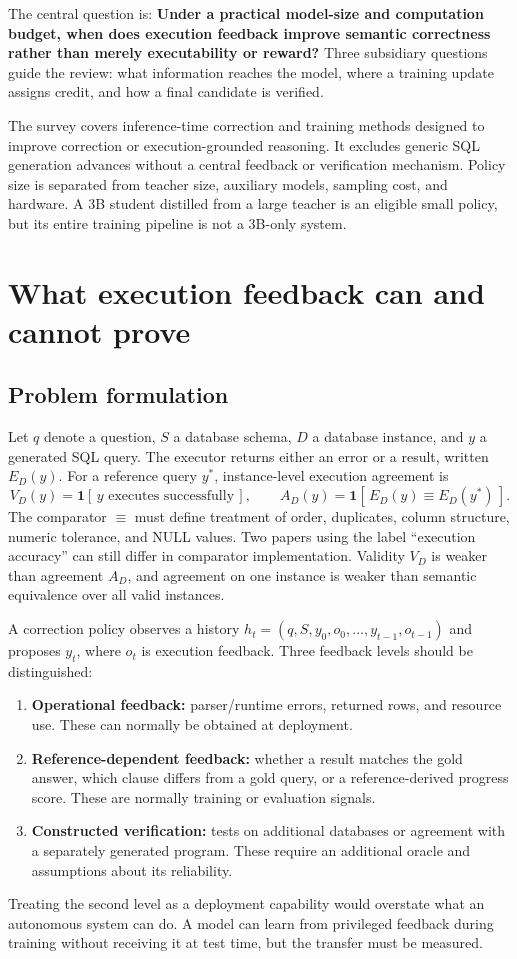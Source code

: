 \documentclass[11pt,a4paper]{article}
\begin{document}
The central question is: \textbf{Under a practical model-size and computation budget, when does execution feedback improve semantic correctness rather than merely executability or reward?} Three subsidiary questions guide the review: what information reaches the model, where a training update assigns credit, and how a final candidate is verified.

The survey covers inference-time correction and training methods designed to improve correction or execution-grounded reasoning. It excludes generic SQL generation advances without a central feedback or verification mechanism. Policy size is separated from teacher size, auxiliary models, sampling cost, and hardware. A 3B student distilled from a large teacher is an eligible small policy, but its entire training pipeline is not a 3B-only system.

\clearpage
\section{What execution feedback can and cannot prove}
\subsection{Problem formulation}
Let $q$ denote a question, $S$ a database schema, $D$ a database instance, and $y$ a generated SQL query. The executor returns either an error or a result, written $E_D(y)$. For a reference query $y^*$, instance-level execution agreement is
\begin{equation}
V_D(y)=\mathbf{1}[\,y\text{ executes successfully}\,],\qquad
A_D(y)=\mathbf{1}[\,E_D(y)\equiv E_D(y^*)\,].
\end{equation}
The comparator $\equiv$ must define treatment of order, duplicates, column structure, numeric tolerance, and NULL values. Two papers using the label ``execution accuracy'' can still differ in comparator implementation. Validity $V_D$ is weaker than agreement $A_D$, and agreement on one instance is weaker than semantic equivalence over all valid instances.

A correction policy observes a history $h_t=(q,S,y_0,o_0,\ldots,y_{t-1},o_{t-1})$ and proposes $y_t$, where $o_t$ is execution feedback. Three feedback levels should be distinguished:
\begin{enumerate}
\item \textbf{Operational feedback:} parser/runtime errors, returned rows, and resource use. These can normally be obtained at deployment.
\item \textbf{Reference-dependent feedback:} whether a result matches the gold answer, which clause differs from a gold query, or a reference-derived progress score. These are normally training or evaluation signals.
\item \textbf{Constructed verification:} tests on additional databases or agreement with a separately generated program. These require an additional oracle and assumptions about its reliability.
\end{enumerate}
Treating the second level as a deployment capability would overstate what an autonomous system can do. A model can learn from privileged feedback during training without receiving it at test time, but the transfer must be measured.
\end{document}

